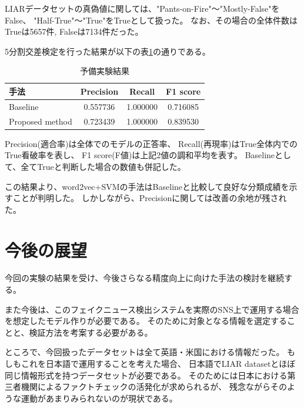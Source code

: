 \documentclass[twocolumn, a4paper, uplatex]{UECIEresume}
\begin{document}
LIARデータセットの真偽値に関しては、"Pants-on-Fire"〜"Mostly-False"をFalse、
"Half-True"〜"True"をTrueとして扱った。
なお、その場合の全体件数はTrueは5657件, Falseは7134件だった。

5分割交差検定を行った結果が以下の表\ref{tb:result}の通りである。

\begin{table}[h]
  \begin{center}
    \caption{予備実験結果}
    \label{tb:result}
    \begin{tabular}{l c c c}
      \hline
      手法 & Precision & Recall & F1 score \\
      \hline
      Baseline & 0.557736 & 1.000000 & 0.716085\\
      Proposed method & 0.723439 & 1.000000 & 0.839530\\
      \hline
    \end{tabular}
  \end{center}
\end{table}

Precision(適合率)は全体でのモデルの正答率、
Recall(再現率)はTrue全体内でのTrue看破率を表し、
F1 score(F値)は上記2値の調和平均を表す。
Baselineとして、全てTrueと判断した場合の数値も併記した。

この結果より、word2vec+SVMの手法はBaselineと比較して良好な分類成績を示すことが判明した。
しかしながら、Precisionに関しては改善の余地が残された。

\section{今後の展望}
今回の実験の結果を受け、今後さらなる精度向上に向けた手法の検討を継続する。

また今後は、このフェイクニュース検出システムを実際のSNS上で運用する場合を想定したモデル作りが必要である。
そのために対象となる情報を選定することと、検証方法を考案する必要がある。

ところで、今回扱ったデータセットは全て英語・米国における情報だった。
もしもこれを日本語で運用することを考えた場合、
日本語でLIAR datasetとほぼ同じ情報形式を持つデータセットが必要である。
そのためには日本における第三者機関によるファクトチェックの活発化が求められるが、
残念ながらそのような運動があまりみられないのが現状である。
\end{document}

